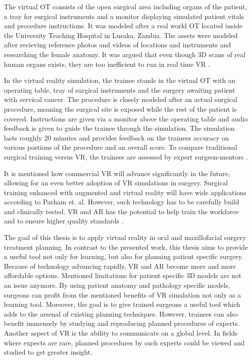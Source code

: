 The virtual OT consists of the open surgical area including organs of the patient, a tray for surgical instruments and a monitor displaying simulated patient vitals and procedure instructions.
It was modeled after a real world OT located inside the University Teaching Hospital in Lusaka, Zambia.
The assets were modeled after recieving reference photos and videos of locations and instruments and researching the female anatomy.
It was argued that even though 3D scans of real human organs exists, they are too inefficient to run in real time VR \cite{RN52}.

In the virtual reality simulation, the trainee stands in the virtual OT with an operating table, tray of surgical instruments and the surgery awaiting patient with cervical cancer.
The procedure is closely modeled after an actual surgical procedure, meaning the surgical site is exposed while the rest of the patient is covered.
Instructions are given via a monitor above the operating table and audio feedback is given to guide the trainee through the simulation.
The simulation lasts roughly 20 minutes and provides feedback on the trainees accuracy on various postions of the procedure and an overall score.
To compare traditional surgical training versus VR, the trainees are assessed by expert surgeon-mentors \cite{RN52}.

It is mentioned how commercial VR will advance significantly in the future, allowing for an even better adoption of VR simulations in surgery.
Surgical training enhanced with augmented and virtual reality will have wide applications according to Parham et. al.
However, such technology has to be carefully build and clinically tested.
VR and AR has the potential to help train the workforce and to ensure higher quality standards \cite{RN52}.

The goal of this thesis is to apply virtual reality in oral and maxillofacial surgery treatment planning.
In contrast to the presented work, this thesis aims to provide a useful tool not only for learning, but also for planning patient specific surgery.
Because of technology advancing rapidly, VR and AR become more and more affordable options.
Mentioned limitations for patient specific 3D models are not an issue anymore.
By using patient anatomy and pathology specific models, surgeons can profit from the mentioned benefits of VR simulation not only as a learning tool.
Moreover, the goal is to give trained surgeons a useful tool which adds to the arsenal of existing planning techniques.
However, trainees can also benefit immensely by studying and reproducing planned procedures of experts.
Another aspect of VR is the ability to communicate on a global level. 
In fields where expects are rare, planned procedures by such experts could be viewed and studied to get greater insight.
